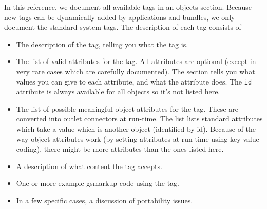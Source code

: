 In this reference, we document all available tags in an objects
section.  Because new tags can be dynamically added by applications
and bundles, we only document the standard system tags.  The
description of each tag consists of
\begin{itemize}
\item The description of the tag, telling you what the tag is.
\item The list of valid attributes for the tag.  All attributes are optional 
(except in very rare cases which are carefully documented).  
The section tells you what values you can give to each attribute, and
what the attribute does.  The \texttt{id} attribute is always
available for all objects so it's not listed here.
\item The list of possible meaningful object attributes for the tag.
These are converted into outlet connectors at run-time.  The list
lists standard attributes which take a value which is another object
(identified by id).  Because of the way object attributes work (by
setting attributes at run-time using key-value coding), there might be
more attributes than the ones listed here.
\item A description of what content the tag accepts.
\item One or more example gsmarkup code using the tag.
\item In a few specific cases, a discussion of portability issues.
\end{itemize}

%
%

